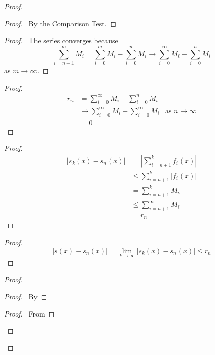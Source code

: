 \documentclass{book}
\theoremstyle{definition}
\begin{document}
  \begin{proof}
    \pf
    \begin{proof}
      \pf\ By the Comparison Test.
    \end{proof}
    \begin{proof}
      \pf\ The series converges because
      \[ \sum_{i=n+1}^m M_i = \sum_{i=0}^m M_i - \sum_{i=0}^n M_i \rightarrow 
      \sum_{i=0}^\infty M_i - \sum_{i=0}^n M_i \]
      as $m \rightarrow \infty$.
    \end{proof}
    \begin{proof}
      \pf\ \begin{align*}
        r_n & = \sum_{i=0}^\infty M_i - \sum_{i=0}^n M_i \\
        & \rightarrow \sum_{i=0}^\infty M_i - \sum_{i=0}^\infty M_i & \text{as } 
        n 
        \rightarrow \infty \\
        & = 0
      \end{align*}
    \end{proof}
    \begin{proof}
      \pf\ \begin{align*}
        |s_k(x) - s_n(x)| & = |\sum_{i=n+1}^k f_i(x)| \\
        & \leq \sum_{i=n+1}^k |f_i(x)| \\
        & = \sum_{i=n+1}^k M_i \\
        & \leq \sum_{i=n+1}^\infty M_i \\
        & = r_n
      \end{align*}
    \end{proof}
    \begin{proof}
      \pf\ \[  |s(x) - s_n(x)| = \lim_{k \rightarrow \infty} |s_k(x) - s_n(x)| 
      \leq r_n \]
    \end{proof}
    \begin{proof}
      \begin{proof}
        \pf\ By 
      \end{proof}
      \begin{proof}
        \pf\ From 
      \end{proof}
    \end{proof}
  \end{proof}
  
\end{document}
